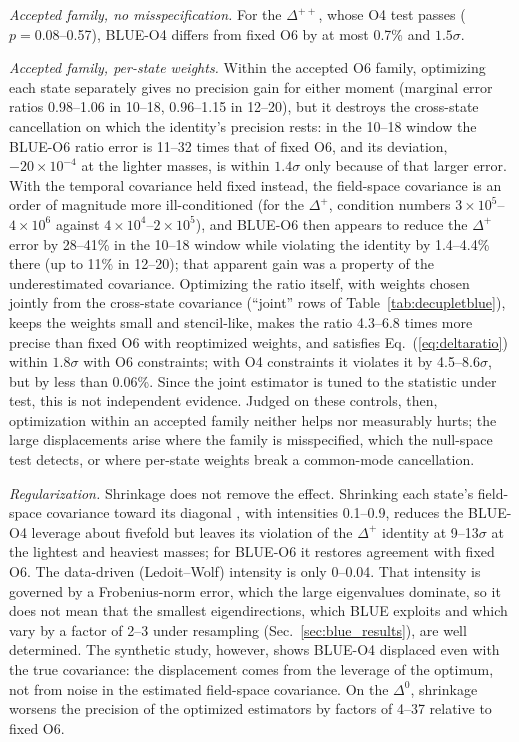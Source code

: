 \documentclass[aps,prd,reprint,twocolumn,superscriptaddress,nofootinbib,longbibliography]{revtex4-2}
\begin{document}
\emph{Accepted family, no misspecification.} For the $\Delta^{++}$, whose O4 test passes ($p=0.08$--0.57), BLUE-O4 differs from fixed O6 by at most 0.7\% and $1.5\sigma$.

\emph{Accepted family, per-state weights.} Within the accepted O6 family, optimizing each state separately gives no precision gain for either moment (marginal error ratios 0.98--1.06 in 10--18, 0.96--1.15 in 12--20), but it destroys the cross-state cancellation on which the identity's precision rests: in the 10--18 window the BLUE-O6 ratio error is 11--32 times that of fixed O6, and its deviation, $-20\times10^{-4}$ at the lighter masses, is within $1.4\sigma$ only because of that larger error. With the temporal covariance held fixed instead, the field-space covariance is an order of magnitude more ill-conditioned (for the $\Delta^+$, condition numbers $3\times10^5$--$4\times10^6$ against $4\times10^4$--$2\times10^5$), and BLUE-O6 then appears to reduce the $\Delta^+$ error by 28--41\% in the 10--18 window while violating the identity by 1.4--4.4\% there (up to 11\% in 12--20); that apparent gain was a property of the underestimated covariance. Optimizing the ratio itself, with weights chosen jointly from the cross-state covariance (``joint'' rows of Table~\ref{tab:decupletblue}), keeps the weights small and stencil-like, makes the ratio 4.3--6.8 times more precise than fixed O6 with reoptimized weights, and satisfies Eq.~(\ref{eq:deltaratio}) within $1.8\sigma$ with O6 constraints; with O4 constraints it violates it by 4.5--8.6$\sigma$, but by less than 0.06\%. Since the joint estimator is tuned to the statistic under test, this is not independent evidence. Judged on these controls, then, optimization within an accepted family neither helps nor measurably hurts; the large displacements arise where the family is misspecified, which the null-space test detects, or where per-state weights break a common-mode cancellation.

\emph{Regularization.} Shrinkage does not remove the effect. Shrinking each state's field-space covariance toward its diagonal \cite{LedoitWolf2004}, with intensities 0.1--0.9, reduces the BLUE-O4 leverage about fivefold but leaves its violation of the $\Delta^+$ identity at 9--13$\sigma$ at the lightest and heaviest masses; for BLUE-O6 it restores agreement with fixed O6. The data-driven (Ledoit--Wolf) intensity is only 0--0.04. That intensity is governed by a Frobenius-norm error, which the large eigenvalues dominate, so it does not mean that the smallest eigendirections, which BLUE exploits and which vary by a factor of 2--3 under resampling (Sec.~\ref{sec:blue_results}), are well determined. The synthetic study, however, shows BLUE-O4 displaced even with the true covariance: the displacement comes from the leverage of the optimum, not from noise in the estimated field-space covariance. On the $\Delta^0$, shrinkage worsens the precision of the optimized estimators by factors of 4--37 relative to fixed O6.
\end{document}
